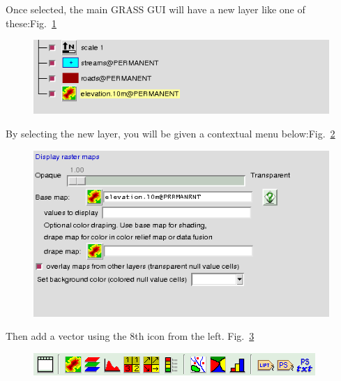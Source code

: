 Once selected, the main GRASS GUI will have a new layer like one of
these:Fig.~\ref{fig:grass004}

\begin{figure}[htbp]
   \centering
   \includegraphics[scale=0.35]{grass004.png}
   \caption{}
   \label{fig:grass004}
\end{figure}

By selecting the new layer, you will be given a contextual menu below:Fig.~\ref{fig:grass005}

\begin{figure}[htbp]
   \centering
   \includegraphics[scale=0.35]{grass005.png}
   \caption{}
   \label{fig:grass005}
\end{figure}

Then add a vector using the 8th icon from the left. Fig.~\ref{fig:grass006}

\begin{figure}[htbp]
   \centering
   \includegraphics[scale=0.5]{grass006.png}
   \caption{}
   \label{fig:grass006}
\end{figure}

